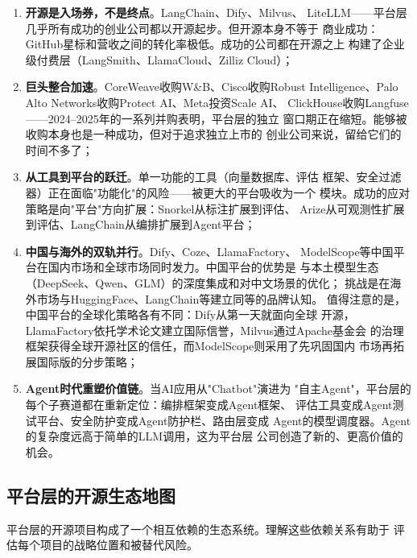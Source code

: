 \begin{keybox}[平台层的五大结构性趋势]
\begin{enumerate}
  \item \textbf{开源是入场券，不是终点}。LangChain、Dify、Milvus、
    LiteLLM——平台层几乎所有成功的创业公司都以开源起步。但开源本身不等于
    商业成功：GitHub星标和营收之间的转化率极低。成功的公司都在开源之上
    构建了企业级付费层（LangSmith、LlamaCloud、Zilliz Cloud）；

  \item \textbf{巨头整合加速}。CoreWeave收购W\&B、Cisco收购Robust
    Intelligence、Palo Alto Networks收购Protect AI、Meta投资Scale AI、
    ClickHouse收购Langfuse——2024--2025年的一系列并购表明，平台层的独立
    窗口期正在缩短。能够被收购本身也是一种成功，但对于追求独立上市的
    创业公司来说，留给它们的时间不多了；

  \item \textbf{从工具到平台的跃迁}。单一功能的工具（向量数据库、评估
    框架、安全过滤器）正在面临"功能化"的风险——被更大的平台吸收为一个
    模块。成功的应对策略是向"平台"方向扩展：Snorkel从标注扩展到评估、
    Arize从可观测性扩展到评估、LangChain从编排扩展到Agent平台；

  \item \textbf{中国与海外的双轨并行}。Dify、Coze、LlamaFactory、
    ModelScope等中国平台在国内市场和全球市场同时发力。中国平台的优势是
    与本土模型生态（DeepSeek、Qwen、GLM）的深度集成和对中文场景的优化；
    挑战是在海外市场与HuggingFace、LangChain等建立同等的品牌认知。
    值得注意的是，中国平台的全球化策略各有不同：Dify从第一天就面向全球
    开源，LlamaFactory依托学术论文建立国际信誉，Milvus通过Apache基金会
    的治理框架获得全球开源社区的信任，而ModelScope则采用了先巩固国内
    市场再拓展国际版的分步策略；

  \item \textbf{Agent时代重塑价值链}。当AI应用从"Chatbot"演进为
    "自主Agent"，平台层的每个子赛道都在重新定位：编排框架变成Agent框架、
    评估工具变成Agent测试平台、安全防护变成Agent防护栏、路由层变成
    Agent的模型调度器。Agent的复杂度远高于简单的LLM调用，这为平台层
    公司创造了新的、更高价值的机会。
\end{enumerate}
\end{keybox}

\subsection{平台层的开源生态地图}

平台层的开源项目构成了一个相互依赖的生态系统。理解这些依赖关系有助于
评估每个项目的战略位置和被替代风险。

